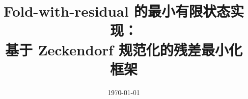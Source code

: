 \documentclass[11pt,letterpaper]{ctexart}
\title{Fold-with-residual 的最小有限状态实现：\\基于 Zeckendorf 规范化的残差最小化框架}
\author{}
\date{\today}
\begin{document}
\maketitle













\FloatBarrier
\appendix


\FloatBarrier

\end{document}
